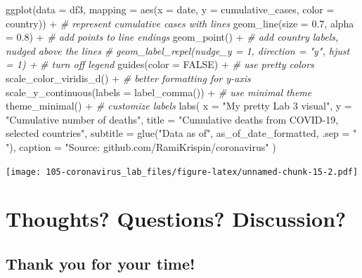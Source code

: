 \documentclass[
]{book}
\newenvironment{Shaded}{\begin{snugshade}}{\end{snugshade}}
\newcommand{\AttributeTok}[1]{\textcolor[rgb]{0.77,0.63,0.00}{#1}}
\newcommand{\CommentTok}[1]{\textcolor[rgb]{0.56,0.35,0.01}{\textit{#1}}}
\newcommand{\ConstantTok}[1]{\textcolor[rgb]{0.00,0.00,0.00}{#1}}
\newcommand{\FloatTok}[1]{\textcolor[rgb]{0.00,0.00,0.81}{#1}}
\newcommand{\FunctionTok}[1]{\textcolor[rgb]{0.00,0.00,0.00}{#1}}
\newcommand{\NormalTok}[1]{#1}
\newcommand{\SpecialCharTok}[1]{\textcolor[rgb]{0.00,0.00,0.00}{#1}}
\newcommand{\StringTok}[1]{\textcolor[rgb]{0.31,0.60,0.02}{#1}}
\begin{document}
\begin{Shaded}
\begin{Highlighting}[]
\FunctionTok{ggplot}\NormalTok{(}\AttributeTok{data =}\NormalTok{ df3,}
       \AttributeTok{mapping =} \FunctionTok{aes}\NormalTok{(}\AttributeTok{x =}\NormalTok{ date, }
                     \AttributeTok{y =}\NormalTok{ cumulative\_cases, }
                     \AttributeTok{color =}\NormalTok{ country)) }\SpecialCharTok{+}
  \CommentTok{\# represent cumulative cases with lines}
  \FunctionTok{geom\_line}\NormalTok{(}\AttributeTok{size =} \FloatTok{0.7}\NormalTok{, }\AttributeTok{alpha =} \FloatTok{0.8}\NormalTok{) }\SpecialCharTok{+}
  \CommentTok{\# add points to line endings}
  \FunctionTok{geom\_point}\NormalTok{() }\SpecialCharTok{+}
  \CommentTok{\# add country labels, nudged above the lines}
  \CommentTok{\# geom\_label\_repel(nudge\_y = 1, direction = "y", hjust = 1) + }
  \CommentTok{\# turn off legend}
  \FunctionTok{guides}\NormalTok{(}\AttributeTok{color =} \ConstantTok{FALSE}\NormalTok{) }\SpecialCharTok{+}
  \CommentTok{\# use pretty colors}
  \FunctionTok{scale\_color\_viridis\_d}\NormalTok{() }\SpecialCharTok{+}
  \CommentTok{\# better formatting for y{-}axis}
  \FunctionTok{scale\_y\_continuous}\NormalTok{(}\AttributeTok{labels =} \FunctionTok{label\_comma}\NormalTok{()) }\SpecialCharTok{+}
  \CommentTok{\# use minimal theme}
  \FunctionTok{theme\_minimal}\NormalTok{() }\SpecialCharTok{+}
  \CommentTok{\# customize labels}
  \FunctionTok{labs}\NormalTok{(}
    \AttributeTok{x =} \StringTok{"My pretty Lab 3 visual"}\NormalTok{,}
    \AttributeTok{y =} \StringTok{"Cumulative number of deaths"}\NormalTok{,}
    \AttributeTok{title =} \StringTok{"Cumulative deaths from COVID{-}19, selected countries"}\NormalTok{,}
    \AttributeTok{subtitle =} \FunctionTok{glue}\NormalTok{(}\StringTok{"Data as of"}\NormalTok{, as\_of\_date\_formatted, }\AttributeTok{.sep =} \StringTok{" "}\NormalTok{),}
    \AttributeTok{caption =} \StringTok{"Source: github.com/RamiKrispin/coronavirus"}
\NormalTok{  )}
\end{Highlighting}
\end{Shaded}

\texttt{[image: 105-coronavirus\_lab\_files/figure-latex/unnamed-chunk-15-2.pdf]}

\hypertarget{thoughts-questions-discussion}{%
\chapter{Thoughts? Questions? Discussion?}\label{thoughts-questions-discussion}}

\hypertarget{thank-you-for-your-time}{%
\section{Thank you for your time!}\label{thank-you-for-your-time}}

  
\end{document}
